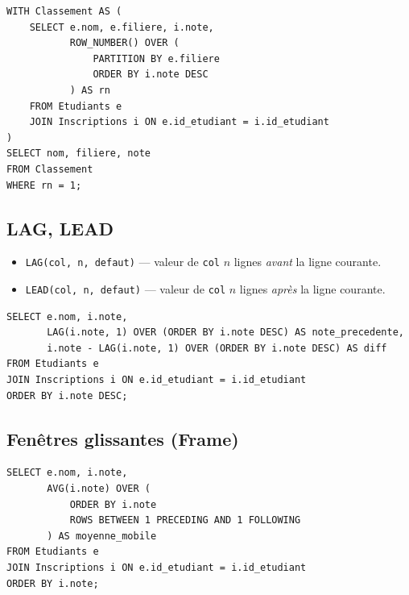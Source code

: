 \begin{codeblock}[title=\textbf{Meilleur \'etudiant par fili\`ere (Top-N par groupe)}]
\begin{verbatim}
WITH Classement AS (
    SELECT e.nom, e.filiere, i.note,
           ROW_NUMBER() OVER (
               PARTITION BY e.filiere
               ORDER BY i.note DESC
           ) AS rn
    FROM Etudiants e
    JOIN Inscriptions i ON e.id_etudiant = i.id_etudiant
)
SELECT nom, filiere, note
FROM Classement
WHERE rn = 1;
\end{verbatim}
\end{codeblock}

\subsection{LAG, LEAD}

\begin{definition}
\begin{itemize}
    \item \texttt{LAG(col, n, defaut)} --- valeur de \texttt{col} $n$ lignes \emph{avant}
          la ligne courante.
    \item \texttt{LEAD(col, n, defaut)} --- valeur de \texttt{col} $n$ lignes \emph{apr\`es}
          la ligne courante.
\end{itemize}
\end{definition}

\begin{codeblock}[title=\textbf{Comparaison avec la ligne pr\'ec\'edente}]
\begin{verbatim}
SELECT e.nom, i.note,
       LAG(i.note, 1) OVER (ORDER BY i.note DESC) AS note_precedente,
       i.note - LAG(i.note, 1) OVER (ORDER BY i.note DESC) AS diff
FROM Etudiants e
JOIN Inscriptions i ON e.id_etudiant = i.id_etudiant
ORDER BY i.note DESC;
\end{verbatim}
\end{codeblock}

\subsection{Fen\^etres glissantes (Frame)}

\begin{codeblock}[title=\textbf{Moyenne mobile sur 3 lignes}]
\begin{verbatim}
SELECT e.nom, i.note,
       AVG(i.note) OVER (
           ORDER BY i.note
           ROWS BETWEEN 1 PRECEDING AND 1 FOLLOWING
       ) AS moyenne_mobile
FROM Etudiants e
JOIN Inscriptions i ON e.id_etudiant = i.id_etudiant
ORDER BY i.note;
\end{verbatim}
\end{codeblock}


